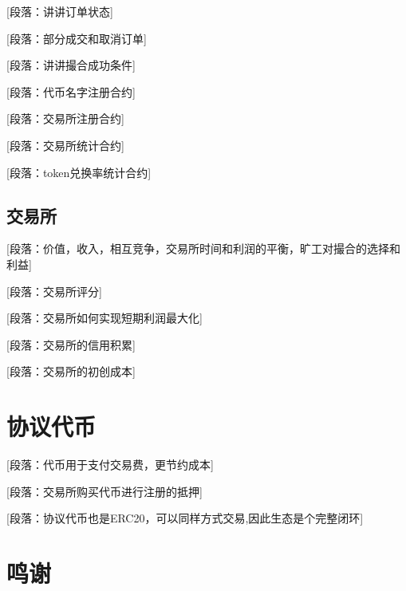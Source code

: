 \documentclass[UTF8,nofonts]{ctexart}
\begin{document}
[段落：讲讲订单状态]

[段落：部分成交和取消订单]

[段落：讲讲撮合成功条件]


[段落：代币名字注册合约]

[段落：交易所注册合约]

[段落：交易所统计合约]

[段落：token兑换率统计合约]


\subsection{交易所\label{sec:exchange}}


[段落：价值，收入，相互竞争，交易所时间和利润的平衡，旷工对撮合的选择和利益]

[段落：交易所评分]

[段落：交易所如何实现短期利润最大化]

[段落：交易所的信用积累]

[段落：交易所的初创成本]


\section{协议代币\label{sec:exchangetoken}}

[段落：代币用于支付交易费，更节约成本]

[段落：交易所购买代币进行注册的抵押]

[段落：协议代币也是ERC20，可以同样方式交易,因此生态是个完整闭环]

\section{鸣谢\label{sec:acknowledgement}}



\end{document}
